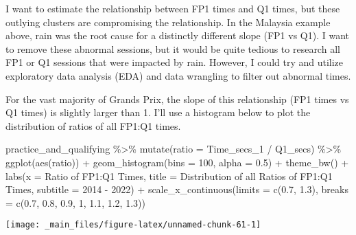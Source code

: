 \documentclass[
]{book}
\newenvironment{Shaded}{\begin{snugshade}}{\end{snugshade}}
\newcommand{\AttributeTok}[1]{\textcolor[rgb]{0.77,0.63,0.00}{#1}}
\newcommand{\DecValTok}[1]{\textcolor[rgb]{0.00,0.00,0.81}{#1}}
\newcommand{\FloatTok}[1]{\textcolor[rgb]{0.00,0.00,0.81}{#1}}
\newcommand{\FunctionTok}[1]{\textcolor[rgb]{0.00,0.00,0.00}{#1}}
\newcommand{\NormalTok}[1]{#1}
\newcommand{\SpecialCharTok}[1]{\textcolor[rgb]{0.00,0.00,0.00}{#1}}
\newcommand{\StringTok}[1]{\textcolor[rgb]{0.31,0.60,0.02}{#1}}
\begin{document}
I want to estimate the relationship between FP1 times and Q1 times, but these outlying clusters are compromising the relationship. In the Malaysia example above, rain was the root cause for a distinctly different slope (FP1 vs Q1). I want to remove these abnormal sessions, but it would be quite tedious to research all FP1 or Q1 sessions that were impacted by rain. However, I could try and utilize exploratory data analysis (EDA) and data wrangling to filter out abnormal times.

For the vast majority of Grands Prix, the slope of this relationship (FP1 times vs Q1 times) is slightly larger than 1. I'll use a histogram below to plot the distribution of ratios of all FP1:Q1 times.

\begin{Shaded}
\begin{Highlighting}[]
\NormalTok{practice\_and\_qualifying }\SpecialCharTok{\%\textgreater{}\%}
  \FunctionTok{mutate}\NormalTok{(}\AttributeTok{ratio =}\NormalTok{ Time\_secs\_1 }\SpecialCharTok{/}\NormalTok{ Q1\_secs) }\SpecialCharTok{\%\textgreater{}\%} 
  \FunctionTok{ggplot}\NormalTok{(}\FunctionTok{aes}\NormalTok{(ratio)) }\SpecialCharTok{+} 
  \FunctionTok{geom\_histogram}\NormalTok{(}\AttributeTok{bins =} \DecValTok{100}\NormalTok{, }\AttributeTok{alpha =} \FloatTok{0.5}\NormalTok{) }\SpecialCharTok{+} 
  \FunctionTok{theme\_bw}\NormalTok{() }\SpecialCharTok{+}
  \FunctionTok{labs}\NormalTok{(}\AttributeTok{x =} \StringTok{\textquotesingle{}Ratio of FP1:Q1 Times\textquotesingle{}}\NormalTok{,}
       \AttributeTok{title =} \StringTok{\textquotesingle{}Distribution of all Ratios of FP1:Q1 Times\textquotesingle{}}\NormalTok{,}
       \AttributeTok{subtitle =} \StringTok{\textquotesingle{}2014 {-} 2022\textquotesingle{}}\NormalTok{) }\SpecialCharTok{+}
  \FunctionTok{scale\_x\_continuous}\NormalTok{(}\AttributeTok{limits =} \FunctionTok{c}\NormalTok{(}\FloatTok{0.7}\NormalTok{, }\FloatTok{1.3}\NormalTok{), }
                     \AttributeTok{breaks =} \FunctionTok{c}\NormalTok{(}\FloatTok{0.7}\NormalTok{, }\FloatTok{0.8}\NormalTok{, }\FloatTok{0.9}\NormalTok{, }\DecValTok{1}\NormalTok{, }\FloatTok{1.1}\NormalTok{, }\FloatTok{1.2}\NormalTok{, }\FloatTok{1.3}\NormalTok{))}
\end{Highlighting}
\end{Shaded}

\begin{center}\texttt{[image: \_main\_files/figure-latex/unnamed-chunk-61-1]} \end{center}
\end{document}
